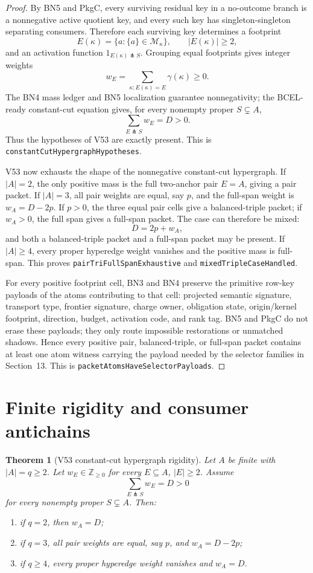 \documentclass[10.5pt,a4paper]{article}
\newtheorem{theorem}{Theorem}[section]
\newcommand{\cut}{\pitchfork}
\begin{document}
\begin{proof}
By BN5 and PkgC, every surviving residual key in a no-outcome branch is a nonnegative active quotient key, and every such key has singleton-singleton separating consumers.  Therefore each surviving key determines a footprint
\[
E(\kappa)=\{a:\{a\}\in\mathcal M_\kappa\},
\qquad |E(\kappa)|\ge2,
\]
and an activation function \(1_{E(\kappa)\cut S}\).  Grouping equal footprints gives integer weights
\[
w_E=\sum_{\kappa:E(\kappa)=E}\gamma(\kappa)\ge0.
\]
The BN4 mass ledger and BN5 localization guarantee nonnegativity; the BCEL-ready constant-cut equation gives, for every nonempty proper \(S\subsetneq A\),
\[
\sum_{E\cut S}w_E=D>0.
\]
Thus the hypotheses of V53 are exactly present.  This is \texttt{constantCutHypergraphHypotheses}.

V53 now exhausts the shape of the nonnegative constant-cut hypergraph.  If \(|A|=2\), the only positive mass is the full two-anchor pair \(E=A\), giving a pair packet.  If \(|A|=3\), all pair weights are equal, say \(p\), and the full-span weight is \(w_A=D-2p\).  If \(p>0\), the three equal pair cells give a balanced-triple packet; if \(w_A>0\), the full span gives a full-span packet.  The case can therefore be mixed:
\[
D=2p+w_A,
\]
and both a balanced-triple packet and a full-span packet may be present.  If \(|A|\ge4\), every proper hyperedge weight vanishes and the positive mass is full-span.  This proves \texttt{pairTriFullSpanExhaustive} and \texttt{mixedTripleCaseHandled}.

For every positive footprint cell, BN3 and BN4 preserve the primitive row-key payloads of the atoms contributing to that cell: projected semantic signature, transport type, frontier signature, charge owner, obligation state, origin/kernel footprint, direction, budget, activation code, and rank tag.  BN5 and PkgC do not erase these payloads; they only route impossible restorations or unmatched shadows.  Hence every positive pair, balanced-triple, or full-span packet contains at least one atom witness carrying the payload needed by the selector families in Section~13.  This is \texttt{packetAtomsHaveSelectorPayloads}.
\end{proof}

\section{Finite rigidity and consumer antichains}

\begin{theorem}[V53 constant-cut hypergraph rigidity]
Let \(A\) be finite with \(|A|=q\ge2\). Let \(w_E\in\mathbb Z_{\ge0}\) for every \(E\subseteq A\), \(|E|\ge2\). Assume
\[
\sum_{E\cut S}w_E=D>0
\]
for every nonempty proper \(S\subsetneq A\). Then:
\begin{enumerate}
\item if \(q=2\), then \(w_A=D\);
\item if \(q=3\), all pair weights are equal, say \(p\), and \(w_A=D-2p\);
\item if \(q\ge4\), every proper hyperedge weight vanishes and \(w_A=D\).
\end{enumerate}
\end{theorem}
\end{document}
